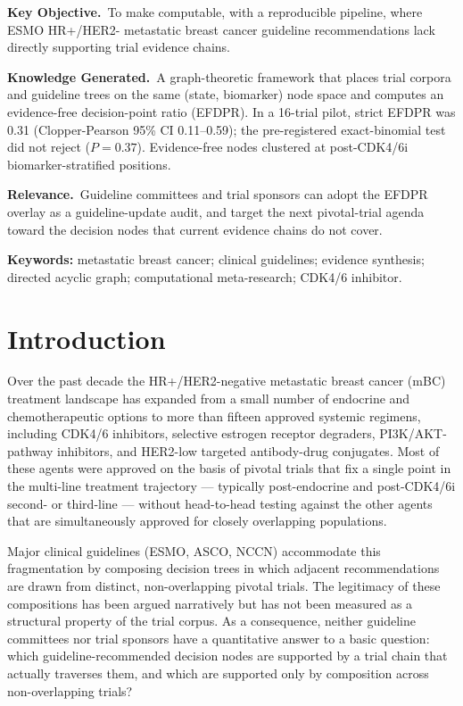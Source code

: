 \documentclass[11pt,a4paper]{article}
\begin{document}
\medskip
\begin{mdframed}[linewidth=0.5pt,roundcorner=4pt,backgroundcolor=gray!8]
\small
\textbf{Key Objective.}\,
To make computable, with a reproducible pipeline, where ESMO HR+/HER2- metastatic breast cancer guideline recommendations lack directly supporting trial evidence chains.

\textbf{Knowledge Generated.}\,
A graph-theoretic framework that places trial corpora and guideline trees on the same (state, biomarker) node space and computes an evidence-free decision-point ratio (EFDPR). In a 16-trial pilot, strict EFDPR was 0.31 (Clopper-Pearson 95\% CI 0.11--0.59); the pre-registered exact-binomial test did not reject ($P=0.37$). Evidence-free nodes clustered at post-CDK4/6i biomarker-stratified positions.

\textbf{Relevance.}\,
Guideline committees and trial sponsors can adopt the EFDPR overlay as a guideline-update audit, and target the next pivotal-trial agenda toward the decision nodes that current evidence chains do not cover.
\end{mdframed}

\medskip
\noindent\textbf{Keywords:} metastatic breast cancer; clinical guidelines; evidence synthesis; directed acyclic graph; computational meta-research; CDK4/6 inhibitor.

\section{Introduction}\label{sec:intro}
Over the past decade the HR+/HER2-negative metastatic breast cancer (mBC) treatment landscape has expanded from a small number of endocrine and chemotherapeutic options to more than fifteen approved systemic regimens, including CDK4/6 inhibitors, selective estrogen receptor degraders, PI3K/AKT-pathway inhibitors, and HER2-low targeted antibody-drug conjugates.\citep{cardosoESMO2024,gradishar2023nccn,giordano2022asco} Most of these agents were approved on the basis of pivotal trials that fix a single point in the multi-line treatment trajectory --- typically post-endocrine and post-CDK4/6i second- or third-line --- without head-to-head testing against the other agents that are simultaneously approved for closely overlapping populations.

Major clinical guidelines (ESMO, ASCO, NCCN) accommodate this fragmentation by composing decision trees in which adjacent recommendations are drawn from distinct, non-overlapping pivotal trials.\citep{cardosoESMO2024,giordano2022asco,gradishar2023nccn} The legitimacy of these compositions has been argued narratively\citep{turner2023evidence,bardia2024hergap} but has not been measured as a structural property of the trial corpus. As a consequence, neither guideline committees nor trial sponsors have a quantitative answer to a basic question: which guideline-recommended decision nodes are supported by a trial chain that actually traverses them, and which are supported only by composition across non-overlapping trials?
\end{document}
